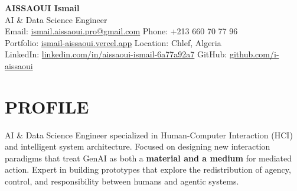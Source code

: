 \documentclass[a4paper,12pt]{article}
\begin{document}
\begin{center}
    {\Huge\bfseries\color{titleblue} AISSAOUI Ismail}\\[4pt]
    {\Large AI \& Data Science Engineer}\\[6pt]

    {\normalsize
    Email: \href{mailto:ismail.aissaoui.pro@gmail.com}{ismail.aissaoui.pro@gmail.com} \quad
    Phone: +213 660 70 77 96 \\
    Portfolio: \href{https://ismail-aissaoui.vercel.app}{ismail-aissaoui.vercel.app} \quad
    Location: Chlef, Algeria \\
    LinkedIn: \href{https://linkedin.com/in/aissaoui-ismail-6a77a92a7}{linkedin.com/in/aissaoui-ismail-6a77a92a7} \quad
    GitHub: \href{https://github.com/i-aissaoui}{github.com/i-aissaoui}
    }
\end{center}

\section{PROFILE}
AI \& Data Science Engineer specialized in Human-Computer Interaction (HCI) and intelligent system architecture. Focused on designing new interaction paradigms that treat GenAI as both a \textbf{material and a medium} for mediated action. Expert in building prototypes that explore the redistribution of agency, control, and responsibility between humans and agentic systems.

\end{document}
